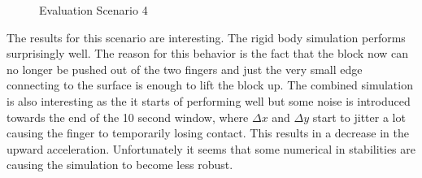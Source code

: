 \begin{figure}[htb]
	\centering
	\caption{Evaluation Scenario 4}
\end{figure}

The results for this scenario are interesting. The rigid body simulation performs surprisingly well. The reason for this behavior is the fact that the block now can no longer be pushed out of the two fingers and just the very small edge connecting to the surface is enough to lift the block up. The combined simulation is also interesting as the it starts of performing well but some noise is introduced towards the end of the 10 second window, where $\Delta x$ and $\Delta y$ start to jitter a lot causing the finger to temporarily losing contact. This results in a decrease in the upward acceleration. Unfortunately it seems that some numerical in stabilities are causing the simulation to become less robust.  
